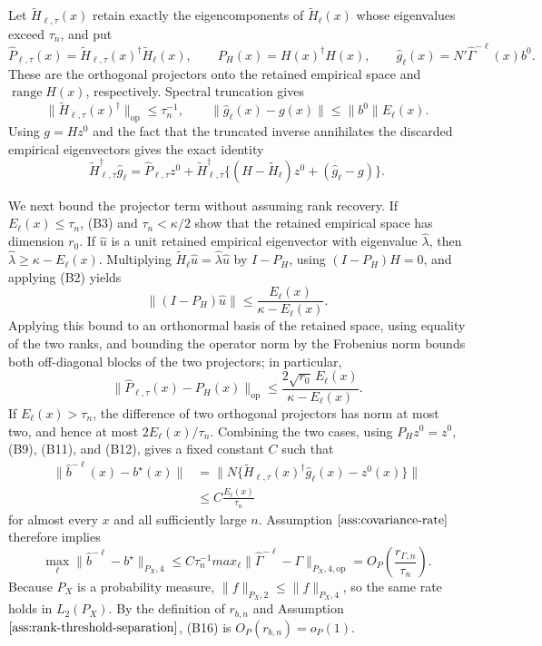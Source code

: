Let \(\widetilde H_{\ell,\tau}(x)\) retain exactly the eigencomponents of \(\widetilde H_\ell(x)\) whose eigenvalues exceed \(\tau_n\), and put
\[
 \widehat P_{\ell,\tau}(x)
 =\widetilde H_{\ell,\tau}(x)^\dagger\widetilde H_\ell(x),
 \qquad
 P_H(x)=H(x)^\dagger H(x),
 \qquad
 \widehat g_\ell(x)=N'\widehat\Gamma^{-\ell}(x)b^0.
 \tag{B10}
\]
These are the orthogonal projectors onto the retained empirical space and \(\operatorname{range}H(x)\), respectively.  Spectral truncation gives
\[
 \|\widetilde H_{\ell,\tau}(x)^\dagger\|_{\mathrm{op}}
 \le\tau_n^{-1},
 \qquad
 \|\widehat g_\ell(x)-g(x)\|
 \le \|b^0\|E_\ell(x).
 \tag{B11}
\]
Using \(g=Hz^0\) and the fact that the truncated inverse annihilates the discarded empirical eigenvectors gives the exact identity
\[
 \widetilde H_{\ell,\tau}^\dagger\widehat g_\ell
 =\widehat P_{\ell,\tau}z^0
 +\widetilde H_{\ell,\tau}^\dagger
 \{(H-\widetilde H_\ell)z^0+(\widehat g_\ell-g)\}.
 \tag{B12}
\]

We next bound the projector term without assuming rank recovery.  If \(E_\ell(x)\le\tau_n\), (B3) and \(\tau_n<\kappa/2\) show that the retained empirical space has dimension \(r_0\).  If \(\widehat u\) is a unit retained empirical eigenvector with eigenvalue \(\widehat\lambda\), then \(\widehat\lambda\ge\kappa-E_\ell(x)\).  Multiplying
\(\widetilde H_\ell\widehat u=\widehat\lambda\widehat u\)
by \(I-P_H\), using \((I-P_H)H=0\), and applying (B2) yields
\[
 \|(I-P_H)\widehat u\|
 \le\frac{E_\ell(x)}{\kappa-E_\ell(x)}.
 \tag{B13}
\]
 Applying this bound to an orthonormal basis of the retained space, using equality of the two ranks, and bounding the operator norm by the Frobenius norm bounds both off-diagonal blocks of the two projectors; in particular,
\[
 \|\widehat P_{\ell,\tau}(x)-P_H(x)\|_{\mathrm{op}}
 \le\frac{2\sqrt{r_0}\,E_\ell(x)}{\kappa-E_\ell(x)}.
\tag{B14}
\]
If \(E_\ell(x)>\tau_n\), the difference of two orthogonal projectors has norm at most two, and hence at most \(2E_\ell(x)/\tau_n\).  Combining the two cases, using \(P_Hz^0=z^0\), (B9), (B11), and (B12), gives a fixed constant \(C\) such that
\[
 \begin{aligned}
 \|\widehat b^{-\ell}(x)-b^\star(x)\|
 &=\|N\{\widetilde H_{\ell,\tau}(x)^\dagger\widehat g_\ell(x)-z^0(x)\}\|\\
 &\le C\frac{E_\ell(x)}{\tau_n}
 \end{aligned}
 \tag{B15}
\]
for almost every \(x\) and all sufficiently large \(n\).  Assumption \(\ref{ass:covariance-rate}\) therefore implies
\[
 \max_\ell\|\widehat b^{-\ell}-b^\star\|_{P_X,4}
 \le C\tau_n^{-1}max_\ell\|\widehat\Gamma^{-\ell}-\Gamma\|_{P_X,4,\mathrm{op}}
 =O_P\!\left(\frac{r_{\Gamma,n}}{\tau_n}\right).
 \tag{B16}
\]
Because \(P_X\) is a probability measure, \(\|f\|_{P_X,2}\le\|f\|_{P_X,4}\), so the same rate holds in \(L_2(P_X)\).  By the definition of \(r_{b,n}\) and Assumption \(\ref{ass:rank-threshold-separation}\), (B16) is \(O_P(r_{b,n})=o_P(1)\).

